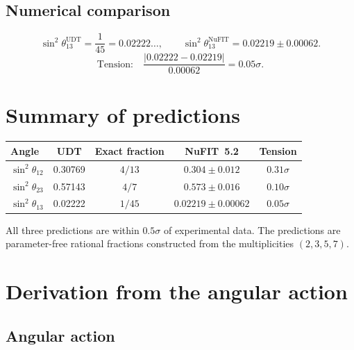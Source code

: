 \documentclass[11pt,letterpaper]{article}
\numberwithin{equation}{section}
\begin{document}
\subsection{Numerical comparison}

\begin{equation}
  \sin^2\theta_{13}^\mathrm{UDT} = \frac{1}{45} = 0.02222\ldots, \qquad
  \sin^2\theta_{13}^\mathrm{NuFIT} = 0.02219 \pm 0.00062.
\end{equation}
\begin{equation}
  \text{Tension:}\quad
  \frac{|0.02222 - 0.02219|}{0.00062} = 0.05\sigma.
\end{equation}

\section{Summary of predictions}
\label{sec:summary}

\begin{center}
\begin{tabular}{lcccc}
\toprule
Angle & UDT & Exact fraction & NuFIT~5.2 & Tension \\
\midrule
$\sin^2\theta_{12}$ & 0.30769 & $4/13$ & $0.304 \pm 0.012$ & $0.31\sigma$ \\
$\sin^2\theta_{23}$ & 0.57143 & $4/7$  & $0.573 \pm 0.016$ & $0.10\sigma$ \\
$\sin^2\theta_{13}$ & 0.02222 & $1/45$ & $0.02219 \pm 0.00062$ & $0.05\sigma$ \\
\bottomrule
\end{tabular}
\end{center}

All three predictions are within $0.5\sigma$ of experimental data. The
predictions are parameter-free rational fractions constructed from the
multiplicities $(2, 3, 5, 7)$.

\section{Derivation from the angular action}
\label{sec:action}

\subsection{Angular action}
\end{document}
